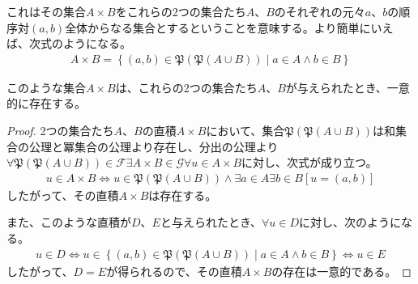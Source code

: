 \documentclass[a4paper]{jsarticle}
\begin{document}
これはその集合$A \times B$をこれらの2つの集合たち$A$、$B$のそれぞれの元々$a$、$b$の順序対$(a,b)$全体からなる集合とするということを意味する。より簡単にいえば、次式のようになる。
\begin{align*}
A \times B = \left\{ (a,b)\in \mathfrak{P}\left( \mathfrak{P}(A \cup B) \right) \middle| a \in A \land b \in B \right\}
\end{align*}
\begin{thm}
\label{1.2.1.16}
このような集合$A \times B$は、これらの2つの集合たち$A$、$B$が与えられたとき、一意的に存在する。
\end{thm}
\begin{proof}
2つの集合たち$A$、$B$の直積$A \times B$において、集合$\mathfrak{P}\left( \mathfrak{P}(A \cup B) \right)$は和集合の公理と冪集合の公理より存在し、分出の公理より$\mathfrak{\forall P}\left( \mathfrak{P}(A \cup B) \right)\in \mathcal{F\exists}A \times B \in \mathcal{G\forall}u \in A \times B$に対し、次式が成り立つ。
\begin{align*}
u \in A \times B \Leftrightarrow u \in \mathfrak{P}\left( \mathfrak{P}(A \cup B) \right) \land \exists a \in A\exists b \in B\left[ u = (a,b) \right]
\end{align*}
したがって、その直積$A \times B$は存在する。\par
また、このような直積が$D$、$E$と与えられたとき、$\forall u \in D$に対し、次のようになる。
\begin{align*}
u \in D \Leftrightarrow u \in \left\{ (a,b)\in \mathfrak{P}\left( \mathfrak{P}(A \cup B) \right) \middle| a \in A \land b \in B \right\} \Leftrightarrow u \in E
\end{align*}
したがって、$D = E$が得られるので、その直積$A \times B$の存在は一意的である。
\end{proof}
\end{document}
